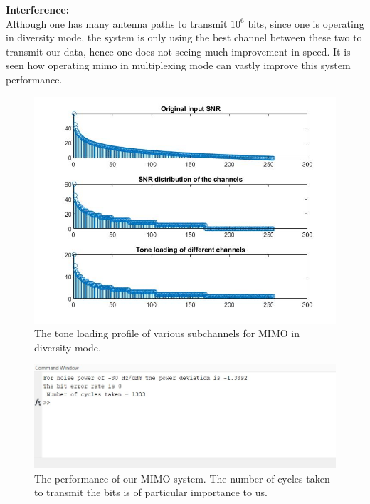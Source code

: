 \textbf{Interference:}\\
Although one has many antenna paths to transmit $10^6$ bits, since one is operating in diversity mode, the system is only using the best channel between these two to transmit our data, hence one does not seeing much improvement in speed. It is seen how operating \acrshort{mimo} in multiplexing mode can vastly improve this system performance.

\begin{figure}[!htbp]
\centering
\includegraphics[scale=0.7]{Chapter 4/Figures/MIMO Tone Loading Diversity}
\caption[MIMO Tone Loading in Diversity Case]{The tone loading profile of various subchannels for MIMO in diversity mode.}
\label{fig:mimo tone loading diversity}
\end{figure}

\begin{figure}[!htbp]
\centering
\includegraphics[scale=1]{Chapter 4/Figures/MIMO System Performance Diversity}
\caption[MIMO System Performance in Diversity Case]{The performance of our MIMO system. The number of cycles taken to transmit the bits is of particular importance to us.}
\label{fig:mimo system performance diversity}
\end{figure}


